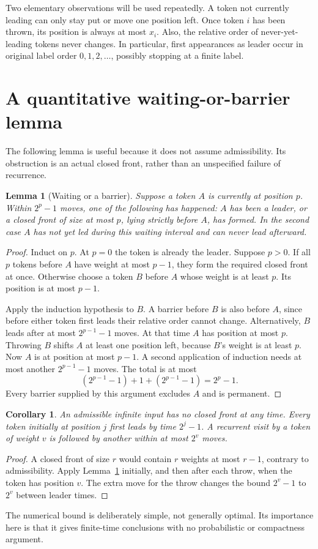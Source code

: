 \documentclass[11pt,letterpaper]{article}
\newtheorem{lemma}[theorem]{Lemma}
\newtheorem{corollary}[theorem]{Corollary}
\theoremstyle{definition}
\begin{document}
Two elementary observations will be used repeatedly. A token not currently
leading can only stay put or move one position left. Once token $i$ has been
thrown, its position is always at most $x_i$. Also, the relative order of
never-yet-leading tokens never changes. In particular, first appearances as
leader occur in original label order $0,1,2,\ldots$, possibly stopping at a
finite label.

\section{A quantitative waiting-or-barrier lemma}\label{sec:waiting}
The following lemma is useful because it does not assume admissibility.
Its obstruction is an actual closed front, rather than an unspecified failure
of recurrence.

\begin{lemma}[Waiting or a barrier]\label{lem:waiting}
Suppose a token $A$ is currently at position $p$. Within $2^p-1$ moves, one
of the following has happened: $A$ has been a leader, or a closed front of
size at most $p$, lying strictly before $A$, has formed. In the second case
$A$ has not yet led during this waiting interval and can never lead afterward.
\end{lemma}
\begin{proof}
Induct on $p$. At $p=0$ the token is already the leader. Suppose $p>0$.
If all $p$ tokens before $A$ have weight at most $p-1$, they form the required
closed front at once. Otherwise choose a token $B$ before $A$ whose weight
is at least $p$. Its position is at most $p-1$.

Apply the induction hypothesis to $B$. A barrier before $B$ is also before
$A$, since before either token first leads their relative order cannot change.
Alternatively, $B$ leads after at most $2^{p-1}-1$ moves. At that time $A$ has
position at most $p$. Throwing $B$ shifts $A$ at least one position left,
because $B$'s weight is at least $p$. Now $A$ is at position at most $p-1$.
A second application of induction needs at most another $2^{p-1}-1$ moves.
The total is at most
\[
 (2^{p-1}-1)+1+(2^{p-1}-1)=2^p-1.
\]
Every barrier supplied by this argument excludes $A$ and is permanent.
\end{proof}

\begin{corollary}\label{cor:no-barrier}
An admissible infinite input has no closed front at any time. Every token
initially at position $j$ first leads by time $2^j-1$. A recurrent visit by a
token of weight $v$ is followed by another within at most $2^v$ moves.
\end{corollary}
\begin{proof}
A closed front of size $r$ would contain $r$ weights at most $r-1$, contrary
to admissibility. Apply Lemma~\ref{lem:waiting} initially, and then after each
throw, when the token has position $v$. The extra move for the throw changes
the bound $2^v-1$ to $2^v$ between leader times.
\end{proof}
The numerical bound is deliberately simple, not generally optimal. Its
importance here is that it gives finite-time conclusions with no probabilistic
or compactness argument.
\end{document}
